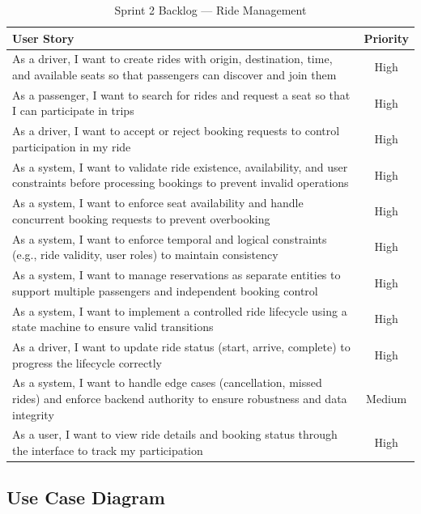 \begin{table}[!htbp]
\centering
\renewcommand{\arraystretch}{1.2}
\setlength{\tabcolsep}{4pt}

\begin{tabular}{|p{}|c|}
\hline
\textbf{User Story} & \textbf{Priority} \\
\hline
As a driver, I want to create rides with origin, destination, time, and available seats so that passengers can discover and join them & High \\
\hline
As a passenger, I want to search for rides and request a seat so that I can participate in trips & High \\
\hline
As a driver, I want to accept or reject booking requests to control participation in my ride & High \\
\hline
As a system, I want to validate ride existence, availability, and user constraints before processing bookings to prevent invalid operations & High \\
\hline
As a system, I want to enforce seat availability and handle concurrent booking requests to prevent overbooking & High \\
\hline
As a system, I want to enforce temporal and logical constraints (e.g., ride validity, user roles) to maintain consistency & High \\
\hline
As a system, I want to manage reservations as separate entities to support multiple passengers and independent booking control & High \\
\hline
As a system, I want to implement a controlled ride lifecycle using a state machine to ensure valid transitions & High \\
\hline
As a driver, I want to update ride status (start, arrive, complete) to progress the lifecycle correctly & High \\
\hline
As a system, I want to handle edge cases (cancellation, missed rides) and enforce backend authority to ensure robustness and data integrity & Medium \\
\hline
As a user, I want to view ride details and booking status through the interface to track my participation & High \\
\hline
\end{tabular}
\caption{Sprint 2 Backlog --- Ride Management}
\label{tab:sprint2_backlog}
\end{table}

\subsection{Use Case Diagram}

